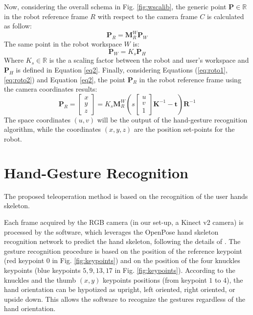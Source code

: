 \documentclass[letterpaper, 10 pt, conference]{ieeeconf}  %
\begin{document}
Now, considering the overall schema in Fig. \ref{fig:wscalib}, the generic point $\mathbf{P}\in\mathbb{R}$ in the robot reference frame $R$ with respect to the camera frame $C$ is calculated as follow:
\begin{equation}\label{eq:roto1}
\mathbf{P}_{R} = \mathbf{M}^W_{R}\mathbf{P}_{W}
\end{equation}
The same point in the robot workspace $W$ is:
\begin{equation}\label{eq:roto2}
\mathbf{P}_{W} = K_s\mathbf{P}_{H}
\end{equation}
Where $K_s\in \mathbb{R}$ is the a scaling factor between the robot and user's workspace and $\mathbf{P}_{H}$ is defined in Equation \ref{eq2}. Finally, considering Equations (\ref{eq:roto1},\ref{eq:roto2}) and Equation \ref{eq2}, the point $\mathbf{P}_R$ in the robot reference frame using the camera coordinates results:
\begin{equation}
\mathbf{P}_{R} = \begin{bmatrix}
x \\
y \\
z
\end{bmatrix}=
K_s\mathbf{M}^W_{R}
\left(s 
\begin{bmatrix}
u \\
v \\
1
\end{bmatrix}
\mathbf{K}^{-1}-\mathbf{t}\right)\mathbf{R}^{-1}
\end{equation}
The space coordinates $(u,v)$ will be the output of the hand-gesture recognition algorithm, while the coordinates $(x,y,z)$ are the position set-points for the robot.


\section{Hand-Gesture Recognition}\label{sec:HG_recon}
The proposed teleoperation method is based on the recognition of the user hands skeleton.

Each frame acquired by the RGB camera (in our set-up, a Kinect v2 camera) is processed by the software, which leverages the OpenPose hand skeleton recognition network to predict the hand skeleton, following the details of \cite{simon2017hand}.
The gesture recognition procedure is based on the position of the reference keypoint (red keypoint $0$ in Fig. \ref{fig:keypoints}) and on the position of the four knuckles keypoints (blue keypoints $5, 9, 13, 17$ in Fig. \ref{fig:keypoints}). According to the knuckles and the thumb $(x, y)$ keypoints positions (from keypoint $1$ to $4$), the hand orientation can be hypotized as upright, left oriented, right oriented, or upside down. This allows the software to recognize the gestures regardless of the hand orientation.
\end{document}

